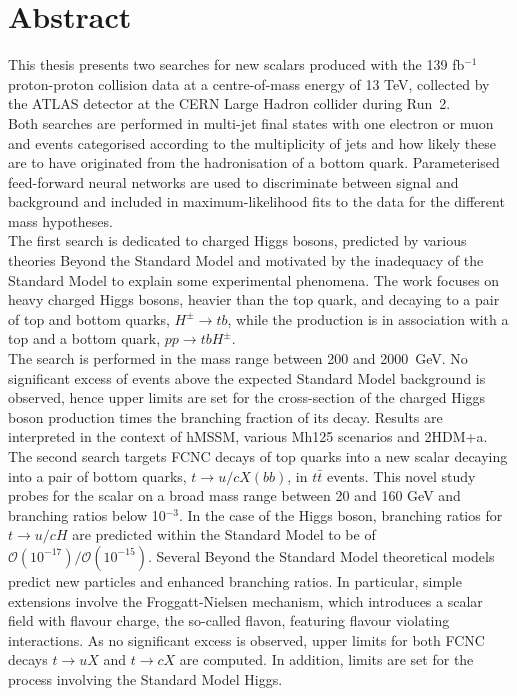 \chapter*{Abstract}


This thesis presents two searches for new scalars produced with the 139 fb$^{-1}$ proton-proton collision data at a centre-of-mass energy of 13 TeV, collected by the ATLAS detector at the CERN Large Hadron collider during Run~2.\\

Both searches are performed in multi-jet final states with one electron or muon and events categorised according to the multiplicity of jets and how likely these are to have originated from the hadronisation of a bottom quark. Parameterised feed-forward neural networks are used to discriminate between signal and background and included in maximum-likelihood fits to the data for the different mass hypotheses.\\

The first search is dedicated to charged Higgs bosons, predicted by various theories Beyond the Standard Model and motivated by the inadequacy of the Standard Model to explain some experimental phenomena. The work focuses on heavy charged Higgs bosons, heavier than the top quark, and decaying to a pair of top and bottom quarks, $H^\pm\to tb$, while the production is in association with a top and a bottom quark, $pp\to tbH^\pm$.\\

The search is performed in the mass range between 200 and 2000~GeV. No significant excess of events above the expected Standard Model background is observed, hence upper limits are set for the cross-section of the charged Higgs boson production times the branching fraction of its decay. Results are interpreted in the context of hMSSM, various Mh125 scenarios and 2HDM+a.\\

The second search targets FCNC decays of top quarks into a new scalar decaying into a pair of bottom quarks, $t \to u/c X(bb)$, in $t\bar{t}$ events. This novel study probes for the scalar on a broad mass range between 20 and 160 GeV and branching ratios below 10$^{-3}$. In the case of the Higgs boson, branching ratios for $t \to u/c H$ are predicted within the Standard Model to be of $\mathcal{O}(10^{-17})/\mathcal{O}(10^{-15})$. Several Beyond the Standard Model theoretical models predict new particles and enhanced branching ratios. In particular, simple extensions involve the Froggatt-Nielsen mechanism, which introduces a scalar field with flavour charge, the so-called flavon, featuring flavour violating interactions. As no significant excess is observed, upper limits for both FCNC decays $t\to uX$ and $t\to cX$ are computed. In addition, limits are set for the process involving the Standard Model Higgs.